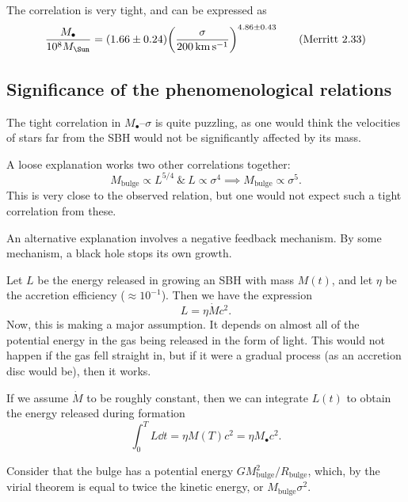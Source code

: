 \documentclass[degn-notes.tex]{subfiles}
\begin{document}
The correlation is very tight, and can be expressed as
%
\begin{displaymath}
  \frac{M_\bullet}{10^8 M_\Sun} =
  (1.66 \pm 0.24)
  \qty(\frac{\sigma}{\SI{200}{\kilo\meter\per\second}})^{4.86\pm0.43}
%
  \tag{Merritt 2.33}
  \label{merritt:2.33}
\end{displaymath}



\subsection{Significance of the phenomenological relations}

The tight correlation in $M_\bullet$--$\sigma$ is quite puzzling, as one would think the velocities of stars far from the SBH would not be significantly affected by its mass.

A loose explanation works two other correlations together:
%
\begin{displaymath}
  M_{\mathrm{bulge}} \propto L^{5/4}\ \&\ L \propto \sigma^4 \implies
  M_{\mathrm{bulge}} \propto \sigma^5.
%
  \tag{Merritt 2.36}
  \label{merritt:2.36}
\end{displaymath}
%
This is very close to the observed relation, but one would not expect such a tight correlation from these.

An alternative explanation involves a negative feedback mechanism. By some mechanism, a black hole stops its own growth.

Let $L$ be the energy released in growing an SBH with mass $M(t)$, and let $\eta$ be the accretion efficiency ($\approx 10^{-1}$). Then we have the expression
%
\begin{displaymath}
  L = \eta \dot{M} c^2.
%
  \tag{Merritt 2.37}
  \label{merritt:2.37}
\end{displaymath}
%
Now, this is making a major assumption. It depends on almost all of the potential energy in the gas being released in the form of light. This would not happen if the gas fell straight in, but if it were a gradual process (as an accretion disc would be), then it works.

If we assume $\dot{M}$ to be roughly constant, then we can integrate $L(t)$ to obtain the energy released during formation
%
\begin{displaymath}
  \int_0^T L \dd{t} =
  \eta M(T) c^2 =
  \eta M_\bullet c^2.
\end{displaymath}

Consider that the bulge has a potential energy $G M_{\mathrm{bulge}}^2 / R_{\mathrm{bulge}}$, which, by the virial theorem is equal to twice the kinetic energy, or $M_{\mathrm{bulge}} \sigma^2$.
\end{document}
